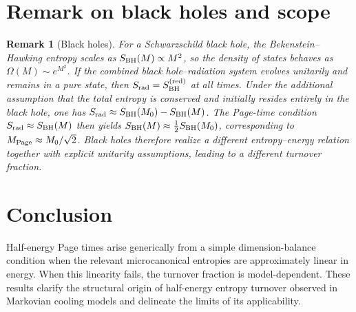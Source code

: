 \documentclass[11pt]{article}
\newtheorem{remark}{Remark}
\begin{document}
\section{Remark on black holes and scope}

\begin{remark}[Black holes]
For a Schwarzschild black hole, the Bekenstein--Hawking entropy scales as
$S_{\rm BH}(M)\propto M^2$, so the density of states behaves as
$\Omega(M)\sim e^{M^2}$.
If the combined black hole--radiation system evolves unitarily and remains in a pure
state, then $S_{\rm rad}=S_{\rm BH}^{(\mathrm{red})}$ at all times.
Under the additional assumption that the total entropy is conserved and initially
resides entirely in the black hole, one has
$S_{\rm rad}\approx S_{\rm BH}(M_0)-S_{\rm BH}(M)$.
The Page-time condition $S_{\rm rad}\approx S_{\rm BH}(M)$ then yields
$S_{\rm BH}(M)\approx \tfrac12 S_{\rm BH}(M_0)$, corresponding to
$M_{\rm Page}\approx M_0/\sqrt{2}$.
Black holes therefore realize a different entropy--energy relation together with
explicit unitarity assumptions, leading to a different turnover fraction.
\end{remark}

\section{Conclusion}

Half-energy Page times arise generically from a simple dimension-balance condition
when the relevant microcanonical entropies are approximately linear in energy.
When this linearity fails, the turnover fraction is model-dependent.
These results clarify the structural origin of half-energy entropy turnover observed
in Markovian cooling models and delineate the limits of its applicability.



\end{document}
